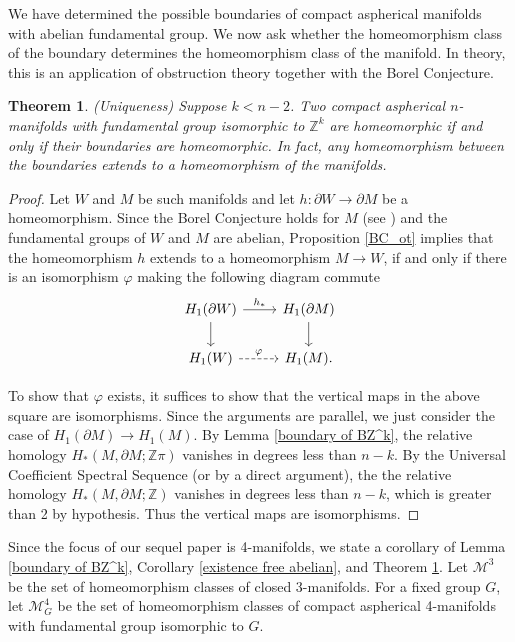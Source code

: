 \documentclass[12pt]{amsart}
\newtheorem{theorem}{Theorem}
\theoremstyle{definition}
\newcommand{\Z}{\mathbb Z}
\newcommand{\cM}{\mathcal M}
\begin{document}
We have determined the possible boundaries of compact aspherical manifolds with abelian fundamental group.   We now ask whether the homeomorphism class of the boundary determines the homeomorphism class of the manifold.   In theory, this is an application of obstruction theory together with the Borel Conjecture.


\begin{theorem} (Uniqueness) \label{uniqueness free abelian} Suppose $k < n-2$. Two  compact aspherical $n$-manifolds with  fundamental group isomorphic to $\Z^k$   are homeomorphic if and only if their boundaries are homeomorphic.  In fact, any homeomorphism between the boundaries extends to a homeomorphism of the manifolds.
\end{theorem}

\begin{proof}
Let $W$ and $M$ be such manifolds and let $h : \partial W \to \partial M$ be a homeomorphism.   Since the Borel Conjecture holds for $M$ (see \cite{BFL}) and the fundamental groups of $W$ and $M$ are abelian, Proposition \ref{BC_ot} implies that the homeomorphism $h$ extends to a homeomorphism $M \to W$, if and only if there is an isomorphism $\varphi$ making the following diagram commute 
$$
\begin{tikzcd}
H_1(\partial W) \arrow[r,"h_*"]  \arrow[d] &  H_1(\partial M)  \arrow[d] \\
H_1(W) \arrow[r,dashed,"\varphi"] &  H_1 (M).
\end{tikzcd}
$$

To show that $\varphi$ exists, it suffices to show that the vertical maps in the above square are isomorphisms.     Since the arguments are parallel, we just consider the case of $H_1 (\partial M) \to H_1(M)$.   By Lemma \ref{boundary of BZ^k}, the relative homology  $H_*(M,\partial M ;\Z \pi)$ vanishes in degrees less than $n-k$.   By the Universal Coefficient Spectral Sequence (or by a direct argument), the  the relative homology  $H_*(M,\partial M ;\Z)$ vanishes in degrees less than $n-k$, which is greater than 2 by hypothesis.   Thus the vertical maps are isomorphisms. 
\end{proof}

Since the focus of our sequel paper \cite{DH2} is 4-manifolds, we state a corollary of Lemma \ref{boundary of BZ^k}, Corollary \ref{existence free abelian}, and Theorem \ref{uniqueness free abelian}.
Let $\cM^3$ be the set of homeomorphism classes of closed 3-manifolds.    For a fixed group $G$, let $\cM^4_G$ be the set of homeomorphism classes of compact aspherical 4-manifolds with fundamental group isomorphic to $G$.
\end{document}

